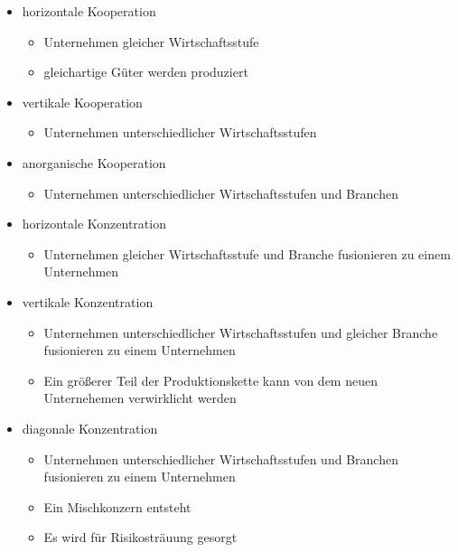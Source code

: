 \begin{itemize}
	\item horizontale Kooperation
		\begin{itemize}
			\item Unternehmen gleicher Wirtschaftsstufe
			\item gleichartige Güter werden produziert
		\end{itemize}
	\item vertikale Kooperation
		\begin{itemize}
			\item Unternehmen unterschiedlicher Wirtschaftsstufen
		\end{itemize}
	\item anorganische Kooperation
		\begin{itemize}
			\item Unternehmen unterschiedlicher Wirtschaftsstufen und Branchen
		\end{itemize}
\end{itemize}

\begin{itemize}
	\item horizontale Konzentration
		\begin{itemize}
			\item Unternehmen gleicher Wirtschaftsstufe und Branche fusionieren zu einem Unternehmen
		\end{itemize}
	\item vertikale Konzentration
		\begin{itemize}
			\item Unternehmen unterschiedlicher Wirtschaftsstufen und gleicher Branche fusionieren zu einem Unternehmen
			\item Ein größerer Teil der Produktionskette kann von dem neuen Unternehemen verwirklicht werden
		\end{itemize}
	\item diagonale Konzentration
		\begin{itemize}
			\item Unternehmen unterschiedlicher Wirtschaftsstufen und Branchen fusionieren zu einem Unternehmen
			\item Ein Mischkonzern entsteht
			\item Es wird für Risikosträuung gesorgt
		\end{itemize}
\end{itemize}


